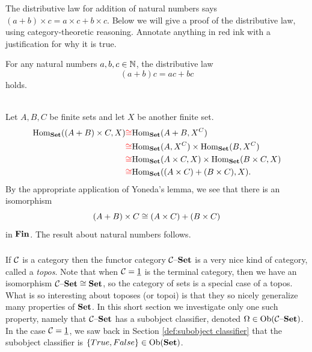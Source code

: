 \documentclass[CT4S-EN-RU]{subfiles}
\begin{document}
\begin{exerciseENG}
The distributive law for addition of natural numbers says $(a+b)\times c=a\times c+b\times c$. Below we will give a proof of the distributive law, using category-theoretic reasoning. Annotate anything in {\color{red}red} ink  with a justification for why it is true.
\begin{propositionENG}
For any natural numbers $a,b,c\in{\mathbb N}$, the distributive law 
$$(a+b)c=ac+bc$$ 
holds.
\end{propositionENG}
\begin{proofENG}
~\\
Let $A,B,C$ be finite sets and let $X$ be another finite set.
\begin{align*}
\textnormal{Hom}_{\mathbf{Set}}((A+B)\times C,X)
&{\color{red}\cong}\textnormal{Hom}_{\mathbf{Set}}(A+B,X^C)\\
&{\color{red}\cong}\textnormal{Hom}_{\mathbf{Set}}(A,X^C)\times\textnormal{Hom}_{\mathbf{Set}}(B,X^C)\\
&{\color{red}\cong}\textnormal{Hom}_{\mathbf{Set}}(A\times C,X)\times\textnormal{Hom}_{\mathbf{Set}}(B\times C,X)\\
&{\color{red}\cong}\textnormal{Hom}_{\mathbf{Set}}((A\times C)+(B\times C),X).
\end{align*}
By {\color{red} the appropriate application} of Yoneda's lemma, we see that there is an isomorphism
$$(A+B)\times C\cong(A\times C)+(B\times C)$$
in ${\mathbf{Fin}}$. The result about natural numbers {\color{red}follows}.
\end{proofENG}
\end{exerciseENG}

\begin{exerciseRUS}
\begin{propositionRUS}
\end{propositionRUS}
\begin{proofRUS}
\end{proofRUS}
\end{exerciseRUS}


\subsubsection{}

\begin{blockENG}
If $\mathcal{C}$ is a category then the functor category $\mathcal{C}{\text \textendash}{\mathbf{Set}}$ is a very nice kind of category, called a {\em topos}. Note that when $\mathcal{C}=\underline{1}$ is the terminal category, then we have an isomorphism $\mathcal{C}{\text \textendash}{\mathbf{Set}}\cong{\mathbf{Set}}$, so the category of sets is a special case of a topos. What is so interesting about toposes (or topoi) is that they so nicely generalize many properties of ${\mathbf{Set}}$. In this short section we investigate only one such property, namely that $\mathcal{C}{\text \textendash}{\mathbf{Set}}$ has a subobject classifier, denoted $\Omega\in\textnormal{Ob}(\mathcal{C}{\text \textendash}{\mathbf{Set}})$. In the case $\mathcal{C}=\underline{1}$, we saw back in Section \ref{def:subobject classifier} that the subobject classifier is $\{True,False\}\in\textnormal{Ob}({\mathbf{Set}})$. 
\end{blockENG}
\end{document}
